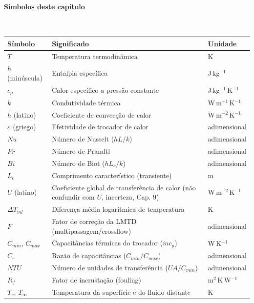 \documentclass[12pt,a4paper]{article}
\numberwithin{equation}{section}
\numberwithin{table}{section}
\numberwithin{figure}{section}
\begin{document}
\paragraph{Símbolos deste capítulo}\mbox{}\\[-0.5em]
{\small
\begin{longtable}{>{\raggedright\arraybackslash}p{2.6cm} >{\raggedright\arraybackslash}p{9.2cm} >{\raggedright\arraybackslash}p{2.6cm}}
	\toprule
	\textbf{Símbolo} & \textbf{Significado} & \textbf{Unidade} \\ \midrule
	\endhead
	$T$ & Temperatura termodinâmica & K \\
	$h$ (minúscula) & Entalpia específica & J\,kg$^{-1}$ \\
	$c_p$ & Calor específico a pressão constante & J\,kg$^{-1}$\,K$^{-1}$ \\
	$k$ & Condutividade térmica & W\,m$^{-1}$\,K$^{-1}$ \\
	$h$ (latino) & Coeficiente de convecção de calor & W\,m$^{-2}$\,K$^{-1}$ \\
	$\varepsilon$ (griego) & Efetividade de trocador de calor & adimensional \\
	$Nu$ & Número de Nusselt ($hL/k$) & adimensional \\
	$Pr$ & Número de Prandtl & adimensional \\
	$Bi$ & Número de Biot ($hL_c/k$) & adimensional \\
	$L_c$ & Comprimento característico (transiente) & m \\
	$U$ (latino) & Coeficiente global de transferência de calor (não confundir com $U$, incerteza, Cap. 9) & W\,m$^{-2}$\,K$^{-1}$ \\
	$\Delta T_{ml}$ & Diferença média logarítmica de temperatura & K \\
	$F$ & Fator de correção da LMTD (multipassagem/crossflow) & adimensional \\
	$C_{min}$, $C_{max}$ & Capacitâncias térmicas do trocador ($\dot m c_p$) & W\,K$^{-1}$ \\
	$C_r$ & Razão de capacitâncias ($C_{min}/C_{max}$) & adimensional \\
	$NTU$ & Número de unidades de transferência ($UA/C_{min}$) & adimensional \\
	$R_f$ & Fator de incrustação (fouling) & m$^2$\,K\,W$^{-1}$ \\
	$T_s$, $T_\infty$ & Temperatura da superfície e do fluido distante & K \\
	\bottomrule
\end{longtable}
}
\end{document}
